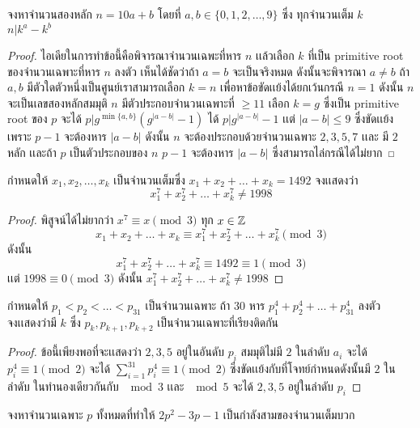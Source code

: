 \documentclass[a4paper,12pt]{scrartcl}
\begin{document}
	\begin{example}
		จงหาจำนวนสองหลัก $n = 10a+b$ โดยที่ $a,b \in \{ 0,1,2,\dots , 9 \}$ ซึ่ง ทุกจำนวนเต็ม $k$\\ $n | k^a-k^b$
	\end{example}
\begin{proof} ไอเดียในการทำข้อนี้คือพิจารณาจำนวนเฉพะที่หาร $n$ เเล้วเลือก $k$ ที่เป็น primitive root  \\ ของจำนวนเฉพาะที่หาร $n$ ลงตัว เห็นได้ชัดว่าถ้า $a=b$ จะเป็นจริงหมด ดังนั้นจะพิจารณา $a\neq b$
ถ้า $a,b$ มีตัวใดตัวหนึ่งเป็นศูนย์เราสามารถเลือก $k=n$ เพื่อหาข้อขัดเเย้งได้ยกเว้นกรณี $n=1$ ดังนั้น $n$ จะเป็นเลขสองหลักสมมุติ $n$ มีตัวประกอบจำนวนเฉพาะที่ $\ge 11$ เลือก $k = g$ ซึ่งเป็น primitive root ของ $p$ จะได้ $p|g^{\min\{a,b \}}(g^{|a-b|}-1)$ ได้ $p |g^{|a-b|}-1$ เเต่ $|a-b| \le 9$ ซึ่งขัดเเย้งเพราะ $p-1$ จะต้องหาร $|a-b|$ ดังนั้น $n$ จะต้องประกอบด้วยจำนวนเฉพาะ $2,3,5,7$ เเละ มี $2$ หลัก เเละถ้า $p$ เป็นตัวประกอบของ $n$ $p-1$ จะต้องหาร $|a-b|$  ซึ่งสามารถไล่กรณีได้ไม่ยาก  
\end{proof}
	\begin{example}
		กำหนดให้ $x_1,x_2,\dots,x_k$ เป็นจำนวนเต็มซึ่ง $x_1+x_2+\dots+x_k = 1492$ จงเเสดงว่า \[ x_1^7+x_2^7+\dots+x_k^7 \neq 1998 \]
	\end{example}
\begin{proof}
	พิสูจน์ได้ไม่ยากว่า $x^7 \equiv x \pmod 3$ 	ทุก $x \in \mathbb Z$ \[ x_1+x_2+\dots+x_k \equiv x_1^7+x_2^7+\dots+x_k^7 \pmod 3 \] ดังนั้น \[x_1^7+x_2^7+\dots+x_k^7 \equiv 1492 \equiv 1 \pmod 3\] เเต่ $1998 \equiv 0 \pmod 3$ ดังนั้น $x_1^7+x_2^7+\dots+x_k^7 \neq 1998$
\end{proof}
	\begin{example}
			กำหนดให้ $p_1<p_2<\dots<p_{31}$ เป็นจำนวนเฉพาะ ถ้า $30$ หาร  $p_1^4+p_2^4+\dots+p_{31}^4$ ลงตัว \\ จงเเสดงว่ามี $k$ ซึ่ง $p_k,p_{k+1},p_{k+2}$ เป็นจำนวนเฉพาะที่เรียงติดกัน
	\end{example}
	\begin{proof}
		ข้อนี้เพียงพอที่จะเเสดงว่า $2,3,5$ อยู่ในอันดับ $p_i$ สมมุติไม่มี $2$ ในลำดับ $a_i$ จะได้ $p_i^4 \equiv 1 \pmod 2$ จะได้ $ \sum_{i=1}^{31} p_i^4 \equiv 1 \pmod 2$ ซึ่งขัดเเย้งกับที่โจทย์กำหนดดังนั้นมี $2$ ในลำดับ ในทำนองเดียวกันกับ $\mod 3$ เเละ $\mod 5$ จะได้ $2,3,5$ อยู่ในลำดับ $p_i$
	\end{proof}
	\begin{example}
		จงหาจำนวนเฉพาะ $p$ ทั้งหมดที่ทำให้ $2p^2-3p-1$ เป็นกำลังสามของจำนวนเต็มบวก
	\end{example}
\end{document}

